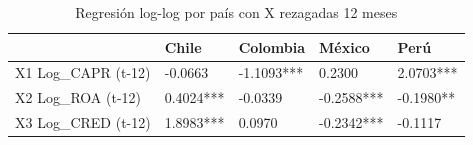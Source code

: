 \begin{table}[htbp]
\centering
\caption{Regresión log-log por país con X rezagadas 12 meses}
\begin{tabular}{lllll}
\hline
 & Chile & Colombia & México & Perú \\
\hline
X1 Log\_CAPR (t-12) & -0.0663 & -1.1093*** & 0.2300 & 2.0703*** \\
X2 Log\_ROA (t-12) & 0.4024*** & -0.0339 & -0.2588*** & -0.1980** \\
X3 Log\_CRED (t-12) & 1.8983*** & 0.0970 & -0.2342*** & -0.1117 \\
\hline
\end{tabular}
\label{tab:tabla9b_por_pais_rezago12}
\end{table}